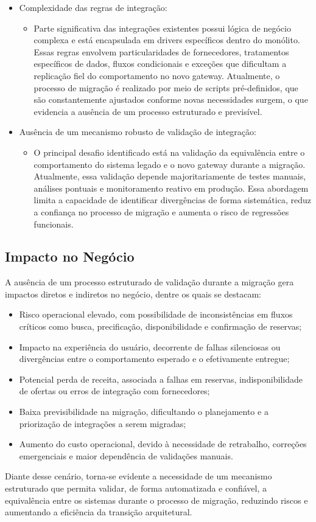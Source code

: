\begin{itemize}
   \item Complexidade das regras de integração:
   \begin{itemize}
     \item Parte significativa das integrações existentes possui lógica de negócio complexa e está encapsulada em drivers específicos dentro do monólito. Essas regras envolvem particularidades de fornecedores, tratamentos específicos de dados, fluxos condicionais e exceções que dificultam a replicação fiel do comportamento no novo gateway. Atualmente, o processo de migração é realizado por meio de scripts pré-definidos, que são constantemente ajustados conforme novas necessidades surgem, o que evidencia a ausência de um processo estruturado e previsível.
   \end{itemize}
   \item Ausência de um mecanismo robusto de validação de integração:
   \begin{itemize}
     \item O principal desafio identificado está na validação da equivalência entre o comportamento do sistema legado e o novo gateway durante a migração. Atualmente, essa validação depende majoritariamente de testes manuais, análises pontuais e monitoramento reativo em produção. Essa abordagem limita a capacidade de identificar divergências de forma sistemática, reduz a confiança no processo de migração e aumenta o risco de regressões funcionais.
   \end{itemize}
 \end{itemize}





\subsection{Impacto no Negócio}

A ausência de um processo estruturado de validação durante a migração gera impactos diretos e indiretos no negócio, dentre os quais se destacam:

\begin{itemize}
   \item Risco operacional elevado, com possibilidade de inconsistências em fluxos críticos como busca, precificação, disponibilidade e confirmação de reservas;
   \item Impacto na experiência do usuário, decorrente de falhas silenciosas ou divergências entre o comportamento esperado e o efetivamente entregue;
   \item Potencial perda de receita, associada a falhas em reservas, indisponibilidade de ofertas ou erros de integração com fornecedores;
   \item Baixa previsibilidade na migração, dificultando o planejamento e a priorização de integrações a serem migradas;
   \item Aumento do custo operacional, devido à necessidade de retrabalho, correções emergenciais e maior dependência de validações manuais.
\end{itemize}

Diante desse cenário, torna-se evidente a necessidade de um mecanismo estruturado que permita validar, de forma automatizada e confiável, a equivalência entre os sistemas durante o processo de migração, reduzindo riscos e aumentando a eficiência da transição arquitetural.